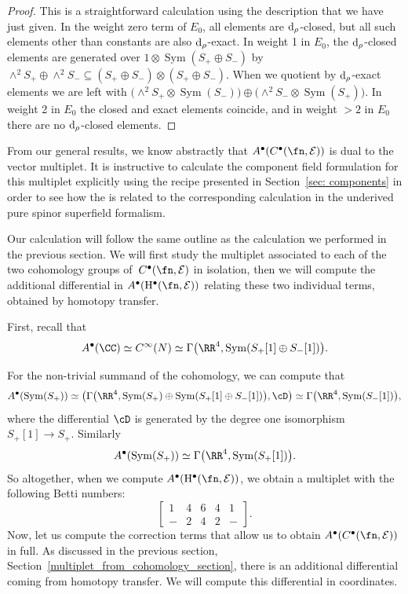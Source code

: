 \documentclass[10pt,a4paper]{amsart}
\numberwithin{equation}{section}
\def\cE{\mathcal E}\def\cF{\mathcal F}\def\cG{\mathcal G}\def\cH{\mathcal H}
\def\d{{\rm d}}
\DeclareMathOperator{\Sym}{Sym}
\begin{document}
\begin{proof}
	This is a straightforward calculation using the description that we have just given. In the weight zero term of $E_0$, all elements are $\d_\rho$-closed, but all such elements other than constants are also $\d_\rho$-exact. In weight 1 in $E_0$, the $\d_\rho$-closed elements are generated over $1 \otimes \Sym(S_+ \oplus S_-)$ by $\wedge^2 S_+ \oplus \wedge^2 S_- \subseteq (S_+ \oplus S_-) \otimes (S_+ \oplus S_-)$. When we quotient by $\d_\rho$-exact elements we are left with $\bigl(\wedge^2 S_+ \otimes \Sym(S_-)\bigr) \oplus \bigl(\wedge^2 S_- \otimes \Sym(S_+)\bigr)$. In weight 2 in $E_0$ the closed and exact elements coincide, and in weight $>2$ in $E_0$ there are no $\d_\rho$-closed elements.
\end{proof}

From our general results, we know abstractly that $A^\bullet(C^\bullet(\fn, \cE))$ is dual to the vector multiplet. It is instructive to calculate the component field formulation for this multiplet explicitly using the recipe presented in Section~\ref{sec: components} in order to see how the is related to the corresponding calculation in the underived pure spinor superfield formalism.

Our calculation will follow the same outline as the calculation we performed in the previous section. We will first study the multiplet associated to each of the two cohomology groups of~$C^\bullet(\fn, \mathcal E)$ in isolation, then we will compute the additional differential in $A^\bullet(\mathrm H^\bullet(\fn, \mathcal E))$ relating these two individual terms, obtained by homotopy transfer.

First, recall that
\begin{equation*}
A^\bullet(\CC) \simeq C^\infty(N)
\simeq \Gamma\big(\RR^4, \Sym(S_+[1] \oplus S_-[1])\big).
\end{equation*}

For the non-trivial summand of the cohomology, we can compute that
\begin{equation*}
A^\bullet(\Sym(S_+)) \simeq \big(\Gamma\big(\RR^4, \Sym(S_+) \oplus \Sym(S_+[1] \oplus S_-[1])\big), \cD\big)
\simeq \Gamma\big(\RR^4, \Sym(S_-[1])\big),
\end{equation*}
where the differential $\cD$ is generated by the degree one isomorphism $S_+[1] \to S_+$. Similarly
\begin{equation*}
A^\bullet(\Sym(S_+)) \simeq \Gamma\big(\RR^4, \Sym(S_+[1])\big).
\end{equation*}
So altogether, when we compute $A^\bullet(\mathrm H^\bullet(\fn, \mathcal E))$, we obtain a multiplet with the following Betti numbers:
\begin{equation*}
\begin{bmatrix}
1 & 4 & 6 & 4 & 1 \\
- & 2 & 4 & 2 &-
\end{bmatrix} .
\end{equation*}
Now, let us compute the correction terms that allow us to obtain $A^\bullet(C^\bullet(\fn, \mathcal E))$ in full. As discussed in the previous section, Section~\ref{multiplet_from_cohomology_section}, there is an additional differential coming from homotopy transfer. We will compute this differential in coordinates.
\end{document}
